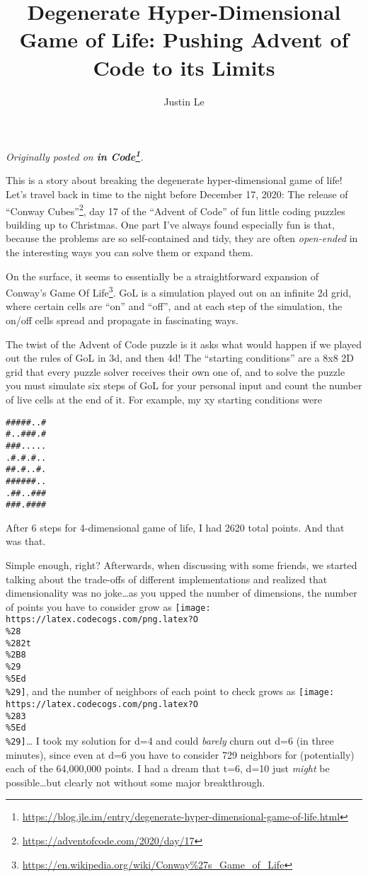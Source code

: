 \documentclass[]{article}
\title{Degenerate Hyper-Dimensional Game of Life: Pushing Advent of Code to its Limits}
\author{Justin Le}
\renewcommand{\href}[2]{#2\footnote{\url{#1}}}
\begin{document}
\maketitle

\emph{Originally posted on
\textbf{\href{https://blog.jle.im/entry/degenerate-hyper-dimensional-game-of-life.html}{in
Code}}.}

This is a story about breaking the degenerate hyper-dimensional game of life!
Let's travel back in time to the night before December 17, 2020: The release of
\href{https://adventofcode.com/2020/day/17}{``Conway Cubes''}, day 17 of the
``Advent of Code'' of fun little coding puzzles building up to Christmas. One
part I've always found especially fun is that, because the problems are so
self-contained and tidy, they are often \emph{open-ended} in the interesting
ways you can solve them or expand them.

On the surface, it seems to essentially be a straightforward expansion of
\href{https://en.wikipedia.org/wiki/Conway\%27s_Game_of_Life}{Conway's Game Of
Life}. GoL is a simulation played out on an infinite 2d grid, where certain
cells are ``on'' and ``off'', and at each step of the simulation, the on/off
cells spread and propagate in fascinating ways.

The twist of the Advent of Code puzzle is it asks what would happen if we played
out the rules of GoL in 3d, and then 4d! The ``starting conditions'' are a 8x8
2D grid that every puzzle solver receives their own one of, and to solve the
puzzle you must simulate six steps of GoL for your personal input and count the
number of live cells at the end of it. For example, my xy starting conditions
were

\begin{verbatim}
#####..#
#..###.#
###.....
.#.#.#..
##.#..#.
######..
.##..###
###.####
\end{verbatim}

After 6 steps for 4-dimensional game of life, I had 2620 total points. And that
was that.

Simple enough, right? Afterwards, when discussing with some friends, we started
talking about the trade-offs of different implementations and realized that
dimensionality was no joke\ldots as you upped the number of dimensions, the
number of points you have to consider grow as
\texttt{[image: https://latex.codecogs.com/png.latex?O\\\%28\\\%282t\\\%2B8\\\%29\\\%5Ed\\\%29]},
and the number of neighbors of each point to check grows as
\texttt{[image: https://latex.codecogs.com/png.latex?O\\\%283\\\%5Ed\\\%29]}\ldots{} I
took my solution for d=4 and could \emph{barely} churn out d=6 (in three
minutes), since even at d=6 you have to consider 729 neighbors for (potentially)
each of the 64,000,000 points. I had a dream that t=6, d=10 just \emph{might} be
possible\ldots but clearly not without some major breakthrough.
\end{document}
